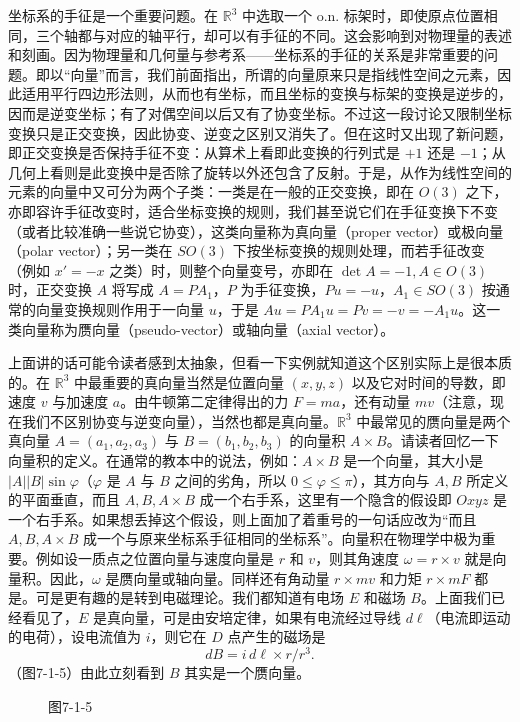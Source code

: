 坐标系的手征是一个重要问题。在 $\mathbb R^3$ 中选取一个 o.n. 标架时，即使原点位置相同，三个轴都与对应的轴平行，却可以有手征的不同。这会影响到对物理量的表述和刻画。因为物理量和几何量与参考系——坐标系的手征的关系是非常重要的问题。即以“向量”而言，我们前面指出，所谓的向量原来只是指线性空间之元素，因此适用平行四边形法则，从而也有坐标，而且坐标的变换与标架的变换是逆步的，因而是逆变坐标；有了对偶空间以后又有了协变坐标。不过这一段讨论又限制坐标变换只是正交变换，因此协变、逆变之区别又消失了。但在这时又出现了新问题，即正交变换是否保持手征不变：从算术上看即此变换的行列式是 $+1$ 还是 $-1$；从几何上看则是此变换中是否除了旋转以外还包含了反射。于是，从作为线性空间的元素的向量中又可分为两个子类：一类是在一般的正交变换，即在 $O(3)$ 之下，亦即容许手征改变时，适合坐标变换的规则，我们甚至说它们在手征变换下不变（或者比较准确一些说它协变），这类向量称为真向量（proper vector）或极向量（polar vector）；另一类在 $SO(3)$ 下按坐标变换的规则处理，而若手征改变（例如 $x'=-x$ 之类）时，则整个向量变号，亦即在 $\det A=-1,A\in O(3)$ 时，正交变换 $A$ 将写成 $A=PA_1$，$P$ 为手征变换，$Pu=-u$，$A_1\in SO(3)$ 按通常的向量变换规则作用于一向量 $u$，于是 $Au=PA_1u=Pv=-v=-A_1u$。这一类向量称为赝向量（pseudo-vector）或轴向量（axial vector）。

上面讲的话可能令读者感到太抽象，但看一下实例就知道这个区别实际上是很本质的。在 $\mathbb R^3$ 中最重要的真向量当然是位置向量 $(x,y,z)$ 以及它对时间的导数，即速度 $v$ 与加速度 $a$。由牛顿第二定律得出的力 $F=ma$，还有动量 $mv$（注意，现在我们不区别协变与逆变向量），当然也都是真向量。$\mathbb R^3$ 中最常见的赝向量是两个真向量 $A=(a_1,a_2,a_3)$ 与 $B=(b_1,b_2,b_3)$ 的向量积 $A\times B$。请读者回忆一下向量积的定义。在通常的教本中的说法，例如：$A\times B$ 是一个向量，其大小是 $|A||B|\sin\varphi$（$\varphi$ 是 $A$ 与 $B$ 之间的劣角，所以 $0\le\varphi\le\pi$），其方向与 $A,B$ 所定义的平面垂直，而且 $A,B,A\times B$ 成一个右手系，这里有一个隐含的假设即 $Oxyz$ 是一个右手系。如果想丢掉这个假设，则上面加了着重号的一句话应改为“而且 $A,B,A\times B$ 成一个与原来坐标系手征相同的坐标系”。向量积在物理学中极为重要。例如设一质点之位置向量与速度向量是 $r$ 和 $v$，则其角速度 $\omega=r\times v$ 就是向量积。因此，$\omega$ 是赝向量或轴向量。同样还有角动量 $r\times mv$ 和力矩 $r\times mF$ 都是。可是更有趣的是转到电磁理论。我们都知道有电场 $E$ 和磁场 $B$。上面我们已经看见了，$E$ 是真向量，可是由安培定律，如果有电流经过导线 $d\ell$（电流即运动的电荷），设电流值为 $i$，则它在 $D$ 点产生的磁场是
\[
 dB=i\,d\ell\times r/r^3.
\]
（图7-1-5）由此立刻看到 $B$ 其实是一个赝向量。

\begin{figure}[htbp]
\centering
{}
\caption*{图7-1-5}
\end{figure}

